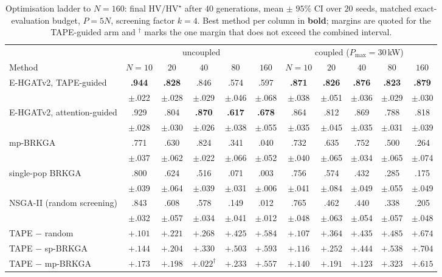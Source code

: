 \documentclass[11pt]{article}
\begin{document}
\begin{table}[t]
\centering\small
\caption{Optimisation ladder to $N{=}160$: final $\mathrm{HV}/\mathrm{HV}^\star$ after $40$
generations, mean $\pm$ $95\%$ CI over $20$ seeds, matched exact-evaluation budget, $P=5N$,
screening factor $k=4$. Best method per column in \textbf{bold}; margins are quoted for the
TAPE-guided arm and $^\dagger$ marks the one margin that does not exceed the combined
interval.}
\label{tab:optladder}
\scriptsize
\setlength{\tabcolsep}{3.5pt}
\begin{tabular}{@{}lccccc@{\hskip 10pt}ccccc@{}}
\toprule
& \multicolumn{5}{c}{uncoupled} & \multicolumn{5}{c}{coupled ($P_{\max}=30$\,kW)}\\
\cmidrule(lr){2-6}\cmidrule(lr){7-11}
Method & $N{=}10$ & $20$ & $40$ & $80$ & $160$ & $N{=}10$ & $20$ & $40$ & $80$ & $160$\\
\midrule
E-HGATv2, TAPE-guided
 & \textbf{.944} & \textbf{.828} & .846 & .574 & .597
 & \textbf{.871} & \textbf{.826} & \textbf{.876} & \textbf{.823} & \textbf{.879}\\
 & \tiny$\pm$.022 & \tiny$\pm$.028 & \tiny$\pm$.029 & \tiny$\pm$.046 & \tiny$\pm$.068
 & \tiny$\pm$.038 & \tiny$\pm$.051 & \tiny$\pm$.036 & \tiny$\pm$.029 & \tiny$\pm$.030\\
E-HGATv2, attention-guided
 & .929 & .804 & \textbf{.870} & \textbf{.617} & \textbf{.678}
 & .864 & .812 & .869 & .788 & .818\\
 & \tiny$\pm$.028 & \tiny$\pm$.030 & \tiny$\pm$.026 & \tiny$\pm$.038 & \tiny$\pm$.055
 & \tiny$\pm$.035 & \tiny$\pm$.045 & \tiny$\pm$.035 & \tiny$\pm$.031 & \tiny$\pm$.039\\
mp-BRKGA
 & .771 & .630 & .824 & .341 & .040
 & .732 & .635 & .752 & .500 & .264\\
 & \tiny$\pm$.037 & \tiny$\pm$.062 & \tiny$\pm$.022 & \tiny$\pm$.066 & \tiny$\pm$.052
 & \tiny$\pm$.040 & \tiny$\pm$.065 & \tiny$\pm$.034 & \tiny$\pm$.065 & \tiny$\pm$.074\\
single-pop BRKGA
 & .800 & .624 & .516 & .071 & .003
 & .756 & .574 & .432 & .285 & .175\\
 & \tiny$\pm$.039 & \tiny$\pm$.064 & \tiny$\pm$.039 & \tiny$\pm$.031 & \tiny$\pm$.006
 & \tiny$\pm$.041 & \tiny$\pm$.084 & \tiny$\pm$.049 & \tiny$\pm$.055 & \tiny$\pm$.049\\
NSGA-II (random screening)
 & .843 & .608 & .578 & .149 & .012
 & .765 & .462 & .440 & .338 & .205\\
 & \tiny$\pm$.032 & \tiny$\pm$.057 & \tiny$\pm$.034 & \tiny$\pm$.041 & \tiny$\pm$.012
 & \tiny$\pm$.048 & \tiny$\pm$.063 & \tiny$\pm$.054 & \tiny$\pm$.057 & \tiny$\pm$.048\\
\midrule
TAPE $-$ random    & $+.101$ & $+.221$ & $+.268$ & $+.425$ & $+.584$ & $+.107$ & $+.364$ & $+.435$ & $+.485$ & $+.674$\\
TAPE $-$ sp-BRKGA  & $+.144$ & $+.204$ & $+.330$ & $+.503$ & $+.593$ & $+.116$ & $+.252$ & $+.444$ & $+.538$ & $+.704$\\
TAPE $-$ mp-BRKGA  & $+.173$ & $+.198$ & $+.022^\dagger$ & $+.233$ & $+.557$ & $+.140$ & $+.191$ & $+.123$ & $+.323$ & $+.615$\\
\bottomrule
\end{tabular}
\end{table}
\end{document}
